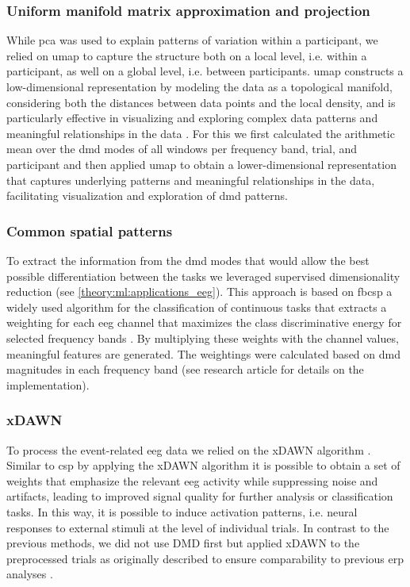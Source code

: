 \subsubsection{Uniform manifold matrix approximation and projection}
While \gls{pca} was used to explain patterns of variation within a participant, we relied on \gls{umap} to capture the structure both on a local level, i.e. within a participant, as well on a global level, i.e. between participants. \Gls{umap} constructs a low-dimensional representation by modeling the data as a topological manifold, considering both the distances between data points and the local density, and is particularly effective in visualizing and exploring complex data patterns and meaningful relationships in the data \cite{mcinnes2018umap}. For this we first calculated the arithmetic mean over the \gls{dmd} modes of all windows per frequency band, trial, and participant and then applied \gls{umap} to obtain a lower-dimensional representation that captures underlying patterns and meaningful relationships in the data, facilitating visualization and exploration of \gls{dmd} patterns.

\subsubsection{Common spatial patterns}
To extract the information from the \gls{dmd} modes that would allow the best possible differentiation between the tasks we leveraged supervised dimensionality reduction (see \autoref{theory:ml:applications_eeg}). This approach is based on \gls{fbcsp} a widely used algorithm for the classification of continuous tasks that extracts a weighting for each \gls{eeg} channel that maximizes the class discriminative energy for selected frequency bands \cite{ang2012filter}. By multiplying these weights with the channel values, meaningful features are generated. The weightings were calculated based on \gls{dmd} magnitudes in each frequency band (see research article  \cite{Goelz2021a} for details on the implementation).

\subsubsection{xDAWN}
To process the event-related \gls{eeg} data we relied on the xDAWN algorithm \cite{rivet2009xdawn}. Similar to \gls{csp} by applying the xDAWN algorithm it is possible to obtain a set of weights that emphasize the relevant \gls{eeg} activity while suppressing noise and artifacts, leading to improved signal quality for further analysis or classification tasks. In this way, it is possible to induce activation patterns, i.e. neural responses to external stimuli at the level of individual trials. In contrast to the previous methods, we did not use DMD first but applied xDAWN to the preprocessed trials as originally described to ensure comparability to previous \gls{erp} analyses \cite{Reuter2019}.\\

